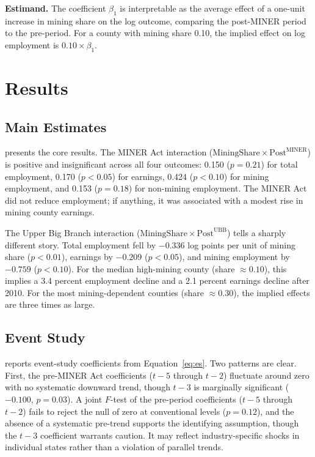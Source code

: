 \documentclass[12pt]{article}
\begin{document}
\textbf{Estimand.} The coefficient $\beta_1$ is interpretable as the average effect of a one-unit increase in mining share on the log outcome, comparing the post-MINER period to the pre-period. For a county with mining share 0.10, the implied effect on log employment is $0.10 \times \beta_1$.


\section{Results}
\label{sec:results}

\subsection{Main Estimates}

 presents the core results. The MINER Act interaction ($\text{MiningShare} \times \text{Post}^{\text{MINER}}$) is positive and insignificant across all four outcomes: 0.150 ($p = 0.21$) for total employment, 0.170 ($p < 0.05$) for earnings, 0.424 ($p < 0.10$) for mining employment, and 0.153 ($p = 0.18$) for non-mining employment. The MINER Act did not reduce employment; if anything, it was associated with a modest rise in mining county earnings.

The Upper Big Branch interaction ($\text{MiningShare} \times \text{Post}^{\text{UBB}}$) tells a sharply different story. Total employment fell by $-0.336$ log points per unit of mining share ($p < 0.01$), earnings by $-0.209$ ($p < 0.05$), and mining employment by $-0.759$ ($p < 0.10$). For the median high-mining county (share $\approx 0.10$), this implies a 3.4 percent employment decline and a 2.1 percent earnings decline after 2010. For the most mining-dependent counties (share $\approx 0.30$), the implied effects are three times as large.



\subsection{Event Study}

 reports event-study coefficients from Equation~\ref{eq:es}. Two patterns are clear. First, the pre-MINER Act coefficients ($t-5$ through $t-2$) fluctuate around zero with no systematic downward trend, though $t-3$ is marginally significant ($-0.100$, $p = 0.03$). A joint $F$-test of the pre-period coefficients ($t-5$ through $t-2$) fails to reject the null of zero at conventional levels ($p = 0.12$), and the absence of a systematic pre-trend supports the identifying assumption, though the $t-3$ coefficient warrants caution. It may reflect industry-specific shocks in individual states rather than a violation of parallel trends.
\end{document}
